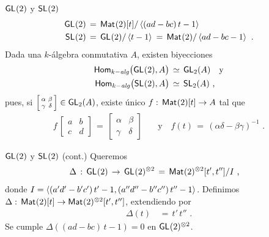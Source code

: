 \begin{frame}{$\GL(2)$ y $\SL(2)$}
	\begin{align*}
		\GL(2) & \,=\,\MM(2)[t]/\generado{(ad-bc)\,t-1} \\
		\SL(2) & \,=\,\GL(2)/\generado{t-1} \,=\,
			\MM(2)/\generado{ad-bc-1}
		\text{ .}
	\end{align*}
	Dada una $k$-\'{a}lgebra conmutativa $A$, existen biyecciones
	\begin{align*}
		\Homalg\big(\GL(2),A\big) & \,\simeq\,
			\GL[2](A) \quad\text{y} \\
		\Homalg\big(\SL(2),A\big) & \,\simeq\,
			\SL[2](A)
		\text{ ,}
	\end{align*}
	pues, si
	\begin{math}
		\left[\begin{smallmatrix}
			\alpha & \beta \\ \gamma & \delta
		\end{smallmatrix}\right]\in\GL[2](A)
	\end{math}, existe \'{u}nico $f:\,\MM(2)[t]\rightarrow A$ tal que
	\begin{align*}
		f\,
		\left[\begin{matrix}
			a & b \\ c & d
		\end{matrix}\right]\,=\,
		\left[\begin{matrix}
			\alpha & \beta \\ \gamma & \delta
		\end{matrix}\right] & \quad\text{y}\quad
		f(t)\,=\,(\alpha\delta-\beta\gamma)^{-1}
		\text{ .}
	\end{align*}
\end{frame}

\begin{frame}{$\GL(2)$ y $\SL(2)$ (cont.)}
	Queremos
	\begin{align*}
		\Delta & \,:\, \GL(2)\,\rightarrow\,\GL(2)^{\otimes 2}
			\,=\,\MM(2)^{\otimes 2}[t',t'']/I
		\text{ ,}
	\end{align*}
	donde $I=\generado{(a'd'-b'c')\,t'-1,(a''d''-b''c'')\,t''-1}$.
	Definimos $\Delta:\,\MM(2)[t]\rightarrow\MM(2)^{\otimes 2}[t',t'']$,
	extendiendo por
	\begin{align*}
		\Delta(t) & \,=\,t'\,t''
		\text{ .}
	\end{align*}
	Se cumple $\Delta((ad-bc)\,t-1)=0$ en $\GL(2)^{\otimes 2}$.
\end{frame}

